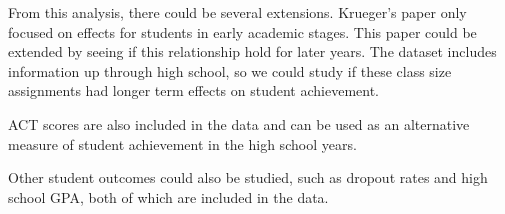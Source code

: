 \documentclass[a4paper,11pt]{article}
\begin{document}
From this analysis, there could be several extensions. Krueger's paper only focused on effects for students in early academic stages. This paper could be extended by seeing if this relationship hold for later years. The dataset includes information up through high school, so we could study if these class size assignments had longer term effects on student achievement. \par

ACT scores are also included in the data and can be used as an alternative measure of student achievement in the high school years. \par

Other student outcomes could also be studied, such as dropout rates and high school GPA, both of which are included in the data. \par
\end{document}
